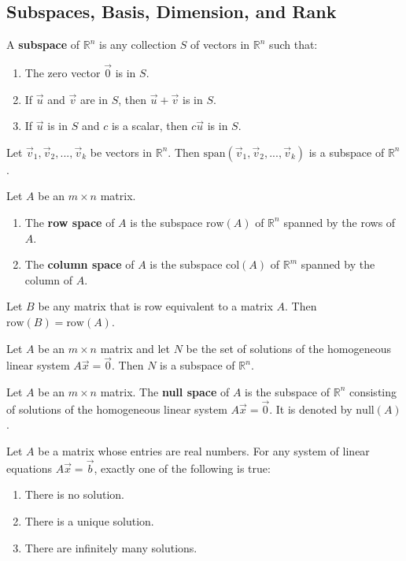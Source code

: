 \documentclass{article}
\begin{document}
\subsection{Subspaces, Basis, Dimension, and Rank}
\begin{definition}
    A \textbf{subspace} of $\mathbb{R}^n$ is any collection $S$ of vectors in $\mathbb{R}^n$ such that:
    \begin{enumerate}
        \item The zero vector $\vec 0$ is in $S$.
        \item If $\vec u$ and $\vec v$ are in $S$, then $\vec u + \vec v$ is in $S$.
        \item If $\vec u$ is in $S$ and $c$ is a scalar, then $c\vec u$ is in $S$.
    \end{enumerate}
\end{definition}
\begin{theorem}
    Let $\vec v_1, \vec v_2, ..., \vec v_k$ be vectors in $\mathbb{R}^n$. Then $\text{span}(\vec v_1, \vec v_2, ..., \vec v_k)$ is a subspace of $\mathbb{R}^n$.
\end{theorem}
\begin{definition}
    Let $A$ be an $m\times n$ matrix.
    \begin{enumerate}
        \item The \textbf{row space} of $A$ is the subspace $\text{row}(A)$ of $\mathbb{R}^n$ spanned by the rows of $A$.
        \item The \textbf{column space} of $A$ is the subspace $\text{col}(A)$ of $\mathbb{R}^m$ spanned by the column of $A$.
    \end{enumerate}
\end{definition}
\begin{theorem}
    Let $B$ be any matrix that is row equivalent to a matrix $A$. Then $\text{row}(B)=\text{row}(A)$.
\end{theorem}
\begin{theorem}
    Let $A$ be an $m\times n$ matrix and let $N$ be the set of solutions of the homogeneous linear system $A\vec x=\vec 0$. Then $N$ is a subspace of $\mathbb{R}^n$.
\end{theorem}
\begin{definition}
    Let $A$ be an $m\times n$ matrix. The \textbf{null space} of $A$ is the subspace of $\mathbb{R}^n$ consisting of solutions of the homogeneous linear system $A\vec x = \vec 0$. It is denoted by $\text{null}(A)$.
\end{definition}
\begin{theorem}
    Let $A$ be a matrix whose entries are real numbers. For any system of linear equations $A\vec x =\vec b$, exactly one of the following is true:
    \begin{enumerate}
        \item There is no solution.
        \item There is a unique solution.
        \item There are infinitely many solutions.
    \end{enumerate}
\end{theorem}
\end{document}
